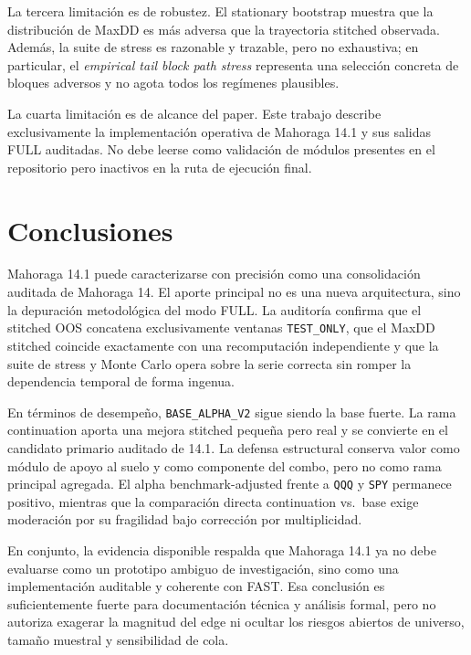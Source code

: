 \documentclass[11pt]{article}
\begin{document}
La tercera limitaci\'on es de robustez. El stationary bootstrap muestra que la distribuci\'on de MaxDD es m\'as adversa que la trayectoria stitched observada. Adem\'as, la suite de stress es razonable y trazable, pero no exhaustiva; en particular, el \textit{empirical tail block path stress} representa una selecci\'on concreta de bloques adversos y no agota todos los reg\'imenes plausibles.

La cuarta limitaci\'on es de alcance del paper. Este trabajo describe exclusivamente la implementaci\'on operativa de Mahoraga 14.1 y sus salidas FULL auditadas. No debe leerse como validaci\'on de m\'odulos presentes en el repositorio pero inactivos en la ruta de ejecuci\'on final.

\section{Conclusiones}
Mahoraga 14.1 puede caracterizarse con precisi\'on como una consolidaci\'on auditada de Mahoraga 14. El aporte principal no es una nueva arquitectura, sino la depuraci\'on metodol\'ogica del modo FULL. La auditor\'ia confirma que el stitched OOS concatena exclusivamente ventanas \texttt{TEST\_ONLY}, que el MaxDD stitched coincide exactamente con una recomputaci\'on independiente y que la suite de stress y Monte Carlo opera sobre la serie correcta sin romper la dependencia temporal de forma ingenua.

En t\'erminos de desempe\~no, \texttt{BASE\_ALPHA\_V2} sigue siendo la base fuerte. La rama continuation aporta una mejora stitched peque\~na pero real y se convierte en el candidato primario auditado de 14.1. La defensa estructural conserva valor como m\'odulo de apoyo al suelo y como componente del combo, pero no como rama principal agregada. El alpha benchmark-adjusted frente a \texttt{QQQ} y \texttt{SPY} permanece positivo, mientras que la comparaci\'on directa continuation vs.\ base exige moderaci\'on por su fragilidad bajo correcci\'on por multiplicidad.

En conjunto, la evidencia disponible respalda que Mahoraga 14.1 ya no debe evaluarse como un prototipo ambiguo de investigaci\'on, sino como una implementaci\'on auditable y coherente con FAST. Esa conclusi\'on es suficientemente fuerte para documentaci\'on t\'ecnica y an\'alisis formal, pero no autoriza exagerar la magnitud del edge ni ocultar los riesgos abiertos de universo, tama\~no muestral y sensibilidad de cola.
\end{document}

